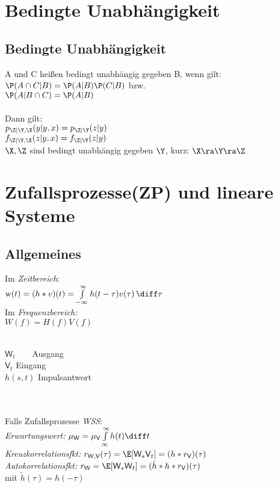 \documentclass[german,color,6pt]{latex4ei/latex4ei_sheet}
\begin{document}
\section{Bedingte Unabhängigkeit}
\label{bed-unabh}
\begin{sectionbox}
	\subsection{Bedingte Unabhängigkeit}
	A und C heißen bedingt unabhängig gegeben B, wenn gilt:\\
	$\P(A \cap C | B) = \P(A | B)\P(C| B)$	bzw.\\
	$\P(A | B \cap C) = \P(A | B)$ \\ \\
	Dann gilt: \\
	$p_{\Z|\Y,\X}(y|y,x) = p_{\Z|\Y}(z|y)$ \\
	$f_{\Z|\Y,\X}(z|y,x) = f_{\Z|\Y}(z|y)$ \\
	$\X,\Z$ sind bedingt unabhängig gegeben $\Y$, kurz: $\X \ra \Y \ra \Z$
\end{sectionbox}

\vfill
\section{Zufallsprozesse(ZP) und lineare Systeme}
\begin{sectionbox}
	\subsection{Allgemeines}
	Im \emph{Zeitbereich}:\\
	$\text{w}(t)  =  (h \ast v)(t) = \int\limits_{- \infty}^{\infty} h(t - \tau) v(\tau) \, \diff\tau$ \\
	Im \emph{Frequenzbereich:}\\
	$W(f) = H(f)V(f)$ \\ \\
	\parbox{3.8cm}{}
	\parbox{3.5cm}{$\textsf{W}_t$  \,\,\,\,\,\,\,\,  Ausgang\\
		$\textsf{V}_t$  \qquad Eingang\\
		$h(s,t)$  Impulsantwort}	\\ \\
	Falls Zufallsprozesse \emph{WSS}: \\
	\emph{Erwartungswert:} $\mu_{\textsf{W}} = \mu_{\textsf{V}} \int\limits_{\infty}^{\infty} h(t) \diff t$\\
	\emph{Kreuzkorrelationsfkt:} $r_{\textsf{W},\textsf{V}}(\tau) = \E [\textsf{W}_s \textsf{V}_t] =  (h * r_{\textsf{V}})(\tau)$\\
	\emph{Autokorrelationsfkt:} $r_{\textsf{W}} = \E [\textsf{W}_s \textsf{W}_t] = (\tilde h * h * r_{\textsf{V}})(\tau)$\\ 
	 mit $\tilde h (\tau) = h(-\tau)$
\end{sectionbox}
\end{document}
